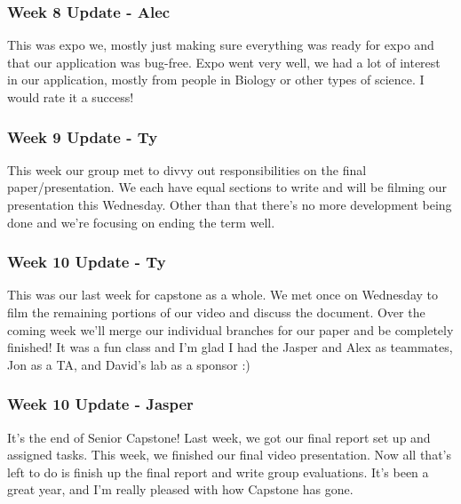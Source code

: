 \subsubsection{Week 8 Update - Alec}
This was expo we, mostly just making sure everything was ready for expo and that our application was bug-free.
Expo went very well, we had a lot of interest in our application, mostly from people in Biology or other types of science.
I would rate it a success!​

\subsubsection{Week 9 Update - Ty}
This week our group met to divvy out responsibilities on the final paper/presentation.
We each have equal sections to write and will be filming our presentation this Wednesday.
Other than that there's no more development being done and we're focusing on ending the term well.

\subsubsection{Week 10 Update - Ty}
This was our last week for capstone as a whole.
We met once on Wednesday to film the remaining portions of our video and discuss the document.
Over the coming week we'll merge our individual branches for our paper and be completely finished!
It was a fun class and I'm glad I had the Jasper and Alex as teammates, Jon as a TA, and David's lab as a sponsor :) ​

\subsubsection{Week 10 Update - Jasper}
It's the end of Senior Capstone!
Last week, we got our final report set up and assigned tasks.
This week, we finished our final video presentation.
Now all that's left to do is finish up the final report and write group evaluations.
It's been a great year, and I'm really pleased with how Capstone has gone.
